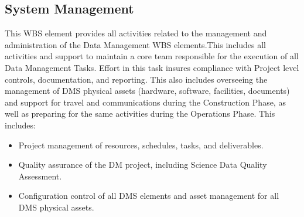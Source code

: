 \subsection{System Management}

This WBS element provides all activities related to the management and
administration of the Data Management WBS elements.This includes all activities
and support to maintain a core team responsible for the execution of all Data
Management Tasks. Effort in this task insures compliance with Project level
controls, documentation, and reporting. This also includes overseeing the
management of DMS physical assets (hardware, software, facilities, documents)
and support for travel and communications during the Construction Phase, as
well as preparing for the same activities during the Operations Phase. This
includes:

\begin{itemize}

  \item{Project management of resources, schedules, tasks, and deliverables.}

  \item{Quality assurance of the DM project, including Science Data Quality
  Assessment.}

  \item{Configuration control of all DMS elements and asset management for all
  DMS physical assets.}

\end{itemize}
